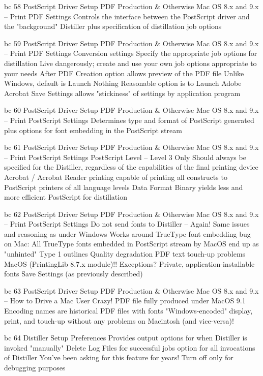 \documentclass[11pt,a4paper]{article}
\begin{document}
bc 58 PostScript Driver Setup PDF Production \& Otherwise Mac OS 8.x and 9.x -- Print PDF Settings Controls the interface between the PostScript driver and the "background" Distiller plus specification of distillation job options

bc 59 PostScript Driver Setup PDF Production \& Otherwise Mac OS 8.x and 9.x -- Print PDF Settings Conversion settings Specify the appropriate job options for distillation Live dangerously; create and use your own job options appropriate to your needs After PDF Creation option allows preview of the PDF file Unlike Windows, default is Launch Nothing Reasonable option is to Launch Adobe Acrobat Save Settings allows "stickiness" of settings by application program

bc 60 PostScript Driver Setup PDF Production \& Otherwise Mac OS 8.x and 9.x -- Print PostScript Settings Determines type and format of PostScript generated plus options for font embedding in the PostScript stream

bc 61 PostScript Driver Setup PDF Production \& Otherwise Mac OS 8.x and 9.x -- Print PostScript Settings PostScript Level -- Level 3 Only Should always be specified for the Distiller, regardless of the capabilities of the final printing device Acrobat / Acrobat Reader printing capable of printing all constructs to PostScript printers of all language levels Data Format Binary yields less and more efficient PostScript for distillation

bc 62 PostScript Driver Setup PDF Production \& Otherwise Mac OS 8.x and 9.x -- Print PostScript Settings Do not send fonts to Distiller -- Again! Same issues and reasoning as under Windows Works around TrueType font embedding bug on Mac: All TrueType fonts embedded in PostScript stream by MacOS end up as "unhinted" Type 1 outlines Quality degradation PDF text touch-up problems MacOS (PrintingLib 8.7.x module)!! Exceptions? Private, application-installable fonts Save Settings (as previously described)

bc 63 PostScript Driver Setup PDF Production \& Otherwise Mac OS 8.x and 9.x -- How to Drive a Mac User Crazy! PDF file fully produced under MacOS 9.1 Encoding names are historical PDF files with fonts "Windows-encoded" display, print, and touch-up without any problems on Macintosh (and vice-versa)!

bc 64 Distiller Setup Preferences Provides output options for when Distiller is invoked "manually" Delete Log Files for successful jobs option for all invocations of Distiller You've been asking for this feature for years! Turn off only for debugging purposes
\end{document}
